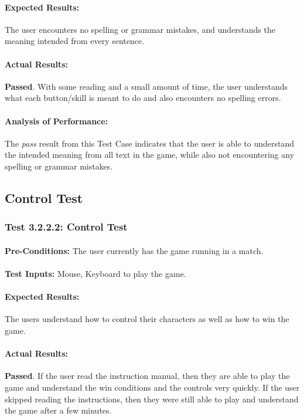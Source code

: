 \documentclass{article}
\begin{document}
    \paragraph{Expected Results:} The user encounters no spelling or grammar mistakes, and understands the meaning intended from every sentence.
    \paragraph{Actual Results:} \textbf{Passed}. With some reading and a small amount of time, the user understands what each button/skill is meant to do and also encounters no spelling errors.
    \paragraph{Analysis of Performance:} The \emph{pass} result from this Test Case indicates that the user is able to understand the intended meaning from all text in the game, while also not encountering any spelling or grammar mistakes. 
\subsection{Control Test}
\subsubsection{Test 3.2.2.2: Control Test }
    \paragraph{}\textbf{Pre-Conditions:} The user currently has the game running in a match.
    \paragraph{}\textbf{Test Inputs:} Mouse, Keyboard to play the game.
    \paragraph{Expected Results:} The users understand how to control their characters as well as how to win the game.
    \paragraph{Actual Results:} \textbf{Passed}. If the user read the instruction manual, then they are able to play the game and understand the win conditions and the controls very quickly. If the user skipped reading the instructions, then they were still able to play and understand the game after a few minutes.
\end{document}
